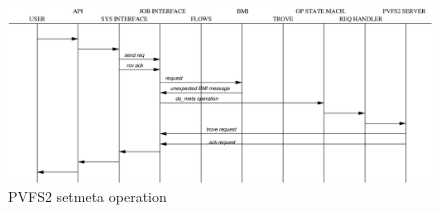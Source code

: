 \documentclass[10pt]{article} %
\begin{document}
\begin{figure}
\centering
\includegraphics[scale=0.5]{setmeta-protocol.eps}
\caption{PVFS2 setmeta operation \label{fig:setmeta-protocol}}
\end{figure}

\end{document}
